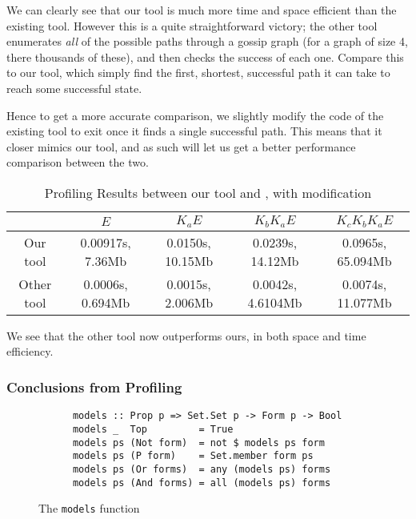 \documentclass[12pt, a4paper]{article}
\begin{document}
We can clearly see that our tool is much more time and space efficient than the
existing tool. However this is a quite straightforward victory; the other tool
enumerates \textit{all} of the possible paths through a gossip graph (for a
graph of size 4, there thousands of these), and then checks the success of each
one. Compare this to our tool, which simply find the first, shortest, successful
path it can take to reach some successful state.

Hence to get a more accurate comparison, we slightly modify the code of the
existing tool to exit once it finds a single successful path. This means that it
closer mimics our tool, and as such will let us get a better performance
comparison between the two. 


\begin{table}[h]
  \centering
  \begin{tabular}{|c||c|c|c|c|}
    \hline
    & $E$ & $ K_a E$ & $K_b K_a E$ & $K_c K_b K_a E$ \\ \hline 
    Our tool   & 0.00917s, 7.36Mb  & 0.0150s, 10.15Mb & 0.0239s, 14.12Mb & 0.0965s, 65.094Mb \\ \hline 
    Other tool & 0.0006s, 0.694Mb  & 0.0015s, 2.006Mb & 0.0042s, 4.6104Mb & 0.0074s, 11.077Mb \\
    \hline
  \end{tabular}
  \caption{Profiling Results between our tool and \cite{GithubGossip}, with modification}
  \label{tab:Proflining2}
\end{table}

We see that the other tool now outperforms ours, in both space and time
efficiency. 

\subsubsection{Conclusions from Profiling}

\begin{wrapfigure}{r}{0.5\textwidth}
  \begin{center}
    \begin{verbatim}
      models :: Prop p => Set.Set p -> Form p -> Bool
      models _  Top         = True
      models ps (Not form)  = not $ models ps form
      models ps (P form)    = Set.member form ps
      models ps (Or forms)  = any (models ps) forms
      models ps (And forms) = all (models ps) forms
    \end{verbatim}
  \end{center}
  \caption{The \texttt{models} function}
  \label{fig:modelsfunction}
\end{wrapfigure}
\end{document}
